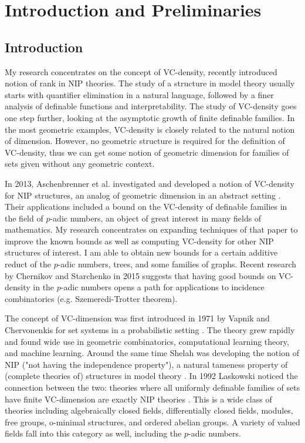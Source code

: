 \chapter{Introduction and Preliminaries}

\section{Introduction}
My research concentrates on the concept of VC-density, recently introduced notion of rank in NIP theories.
The study of a structure in model theory usually starts with quantifier elimination in a natural language, followed by a finer analysis of definable functions and interpretability.
The study of VC-density goes one step further, looking at the asymptotic growth of finite definable families.
In the most geometric examples, VC-density is closely related to the natural notion of dimension.
However, no geometric structure is required for the definition of VC-density, thus we can get some notion of geometric dimension for families of sets given without any geometric context.

In 2013, Aschenbrenner et al. investigated and developed a notion of VC-density for NIP structures, an analog of geometric dimension in an abstract setting \cite{density}. Their applications included a bound on the VC-density of definable families in the field of $p$-adic numbers, an object of great interest in many fields of mathematics. My research concentrates on expanding techniques of that paper to improve the known bounds as well as computing VC-density for other NIP structures of interest. I am able to obtain new bounds for a certain additive reduct of the $p$-adic numbers, trees, and some families of graphs. Recent research by Chernikov and Starchenko in 2015 \cite{regularity} suggests that having good bounds on VC-density in the $p$-adic numbers opens a path for applications to incidence combinatorics (e.g. Szemeredi-Trotter theorem).

The concept of VC-dimension was first introduced in 1971 by Vapnik and Chervonenkis for set systems in a probabilistic setting \cite{vc71}.
The theory grew rapidly and found wide use in geometric combinatorics, computational learning theory, and machine learning.
Around the same time Shelah was developing the notion of NIP ("not having the independence property"),
a natural tameness property of (complete theories of) structures in model theory \cite{shelah_nip}.
In 1992 Laskowski noticed the connection between the two: theories where all uniformly definable families of sets have finite VC-dimension are exactly NIP theories \cite{laskowski92}.
This is a wide class of theories including algebraically closed fields, differentially closed fields, modules, free groups, o-minimal structures, and ordered abelian groups.
A variety of valued fields fall into this category as well, including the $p$-adic numbers.

